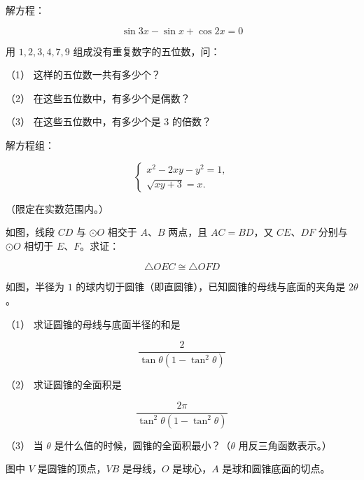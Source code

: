 \begin{question}
解方程：

\nopagebreak[4]
\[
\sin3x-\sin x+\cos2x=0
\]

\end{question}
\begin{question}
用 $1,2,3,4,7,9$ 组成没有重复数字的五位数，问：

（1） 这样的五位数一共有多少个？

（2） 在这些五位数中，有多少个是偶数？

（3） 在这些五位数中，有多少个是 $3$ 的倍数？

\end{question}
\begin{question}
解方程组：

\nopagebreak[4]
\[
\begin{cases}
x^2-2xy-y^2=1,\\[2pt]
\sqrt{xy+3}=x.
\end{cases}
\]

（限定在实数范围内。）

\Needspace{0.4\textheight}
\end{question}
\begin{question}
如图，线段 $CD$ 与 $\odot O$ 相交于 $A\text{、}B$ 两点，且 $AC=BD$，又 $CE\text{、}DF$ 分别与 $\odot O$ 相切于 $E\text{、}F$。求证：

\nopagebreak[4]
\[
\triangle OEC\cong\triangle OFD
\]
\nopagebreak[4]
\begin{center}\end{center}
\nopagebreak[4]
\Needspace{0.4\textheight}
\end{question}
\begin{question}
如图，半径为 $1$ 的球内切于圆锥（即直圆锥），已知圆锥的母线与底面的夹角是 $2\theta$。

（1） 求证圆锥的母线与底面半径的和是

\nopagebreak[4]
\[
\frac{2}{\tan\theta\left(1-\tan^2\theta\right)}
\]

（2） 求证圆锥的全面积是

\nopagebreak[4]
\[
\frac{2\pi}{\tan^2\theta\left(1-\tan^2\theta\right)}
\]

（3） 当 $\theta$ 是什么值的时候，圆锥的全面积最小？（$\theta$ 用反三角函数表示。）

图中 $V$ 是圆锥的顶点，$VB$ 是母线，$O$ 是球心，$A$ 是球和圆锥底面的切点。
\nopagebreak[4]
\begin{center}\end{center}
\nopagebreak[4]

\end{question}